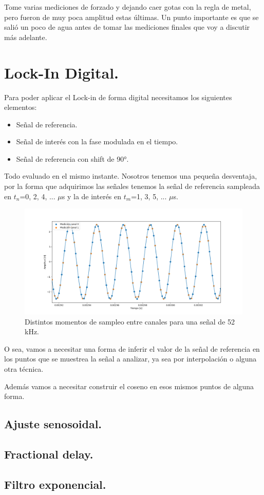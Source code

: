 Tome varias mediciones de forzado y dejando caer gotas con la regla de metal, pero fueron de muy poca amplitud estas últimas. Un punto importante es que se salió un poco de agua antes de tomar las mediciones finales que voy a discutir más adelante.

\section{Lock-In Digital.}
Para poder aplicar el Lock-in de forma digital necesitamos los siguientes elementos:

\begin{itemize}
	\item Señal de referencia.
	\item Señal de interés con la fase modulada en el tiempo.
	\item Señal de referencia con shift de 90°. 
\end{itemize}

Todo evaluado en el mismo instante. Nosotros tenemos una pequeña desventaja, por la forma que adquirimos las señales tenemos la señal de referencia sampleada en $t_n$=0, 2, 4, ... $\mu$s y la de interés en $t_m$=1, 3, 5, ... $\mu$s. 

\begin{figure}[th!]
	\centering
	\includegraphics[width=0.87\linewidth]{Figures/09_06_2025/Sampleos2}
	\caption{Distintos momentos de sampleo entre canales para una señal de 52 kHz.}
	\label{fig:sampleos2}
\end{figure}

O sea, vamos a necesitar una forma de inferir el valor de la señal de referencia en los puntos que se muestrea la señal a analizar, ya sea por interpolación o alguna otra técnica. 

Además vamos a necesitar construir el coseno en esos mismos puntos de alguna forma. %

\subsection*{Ajuste senosoidal.} 





\subsection*{Fractional delay.} 




\subsection*{Filtro exponencial.}

